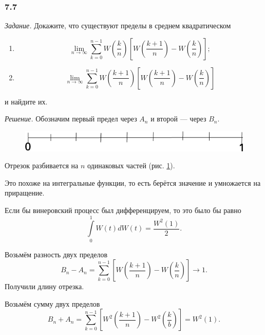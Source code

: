 \subsubsection*{7.7}

\textit{Задание.}
Докажите, что существуют пределы в среднем квадратическом
\begin{enumerate}[label=\alph*)]
  \item $$ \lim \limits_{n \to \infty }
    \sum \limits_{k = 0}^{n - 1}
      W \left( \frac{k}{n} \right)
      \left[ W \left( \frac{k + 1}{n} \right) - W \left( \frac{k}{n} \right) \right];$$
  \item $$ \lim \limits_{n \to \infty }
    \sum \limits_{k = 0}^{n - 1}
      W \left( \frac{k + 1}{n} \right)
      \left[ W \left( \frac{k + 1}{n} \right) - W \left( \frac{k}{n} \right) \right] $$
\end{enumerate}
и найдите их.

\textit{Решение.}
Обозначим первый предел через $A_n$ и второй --- через $B_n$.

\begin{figure}[h!]
  \centering
  \includegraphics[width=.4\textwidth]{./pictures/7_7.png}
  \caption{}
  \label{fig:77}
\end{figure}

Отрезок разбивается на $n$ одинаковых частей (рис. \ref{fig:77}).

Это похоже на интегральные функции, то есть берётся значение и умножается на приращение.

Если бы винеровский процесс был дифференцируем, то это было бы равно
\begin{equation*}
  \int \limits_0^1 W \left( t \right) dW \left( t \right) =
  \frac{W^2 \left( 1 \right) }{2}.
\end{equation*}

Возьмём разность двух пределов
\begin{equation*}
  B_n - A_n =
  \sum \limits_{k = 0}^{n - 1}
    \left[ W \left( \frac{k + 1}{n} \right) - W \left( \frac{k}{n} \right) \right] \to
  1.
\end{equation*}
Получили длину отрезка.

Возьмём сумму двух пределов
\begin{equation*}
  B_n + A_n =
  \sum \limits_{k = 0}^{n - 1}
    \left[ W^2 \left( \frac{k + 1}{n} \right) - W^2 \left( \frac{k}{b} \right) \right] =
  W^2 \left( 1 \right).
\end{equation*}


